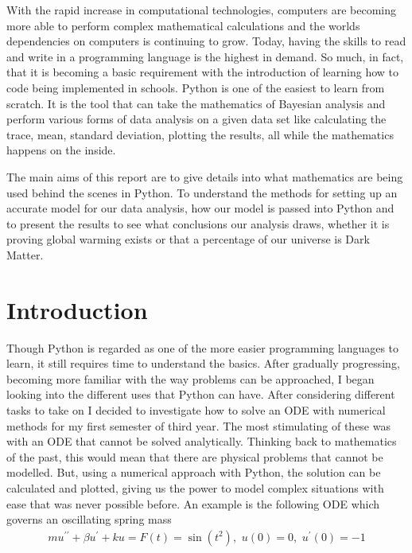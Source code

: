 \documentclass[12pt,twoside]{report}   %
\begin{document}
With the rapid increase in computational technologies, computers are becoming more able to perform complex mathematical calculations and the worlds dependencies on computers is continuing to grow. Today, having the skills to read and write in a programming language is the highest in demand. So much, in fact, that it is becoming a basic requirement with the introduction of learning how to code being implemented in schools. Python is one of the easiest to learn from scratch. It is the tool that can take the mathematics of Bayesian analysis and perform various forms of data analysis on a given data set like calculating the trace, mean, standard deviation, plotting the results, all while the mathematics happens on the inside.

The main aims of this report are to give details into what mathematics are being used behind the scenes in Python. To understand the methods for setting up an accurate model for our data analysis, how our model is passed into Python and to present the results to see what conclusions our analysis draws, whether it is proving global warming exists or that a percentage of our universe is Dark Matter.

\tableofcontents

\chapter*{Introduction}\thispagestyle{plain}

Though Python is regarded as one of the more easier programming languages to learn, it still requires time to understand the basics. After gradually progressing, becoming more familiar with the way problems can be approached, I began looking into the different uses that Python can have. After considering different tasks to take on I decided to investigate how to solve an ODE with numerical methods for my first semester of third year. The most stimulating of these was with an ODE that cannot be solved analytically. Thinking back to mathematics of the past, this would mean that there are physical problems that cannot be modelled. But, using a numerical approach with Python, the solution can be calculated and plotted, giving us the power to model complex situations with ease that was never possible before. An example is the following ODE which governs an oscillating spring mass
\begin{align*}
mu^{\prime\prime} + \beta u^{\prime} + ku = F(t) = \sin(t^2),\,\,u(0) = 0,\,\,u^{\prime}(0) = -1
\end{align*}
\end{document}
